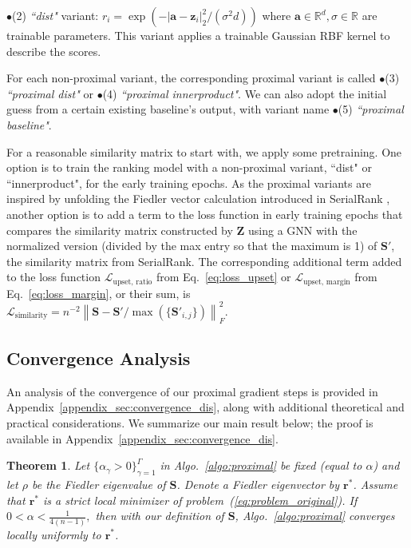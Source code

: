 \documentclass[nohyperref]{article}
\theoremstyle{plain}
\newtheorem{theorem}{Theorem}[section]
\theoremstyle{definition}
\theoremstyle{remark}
\newcommand{\bb}{\hspace{-1mm} $\bullet$}
\begin{document}
\bb (2) \emph{``dist"} variant: $r_i = \exp(-|\mathbf{a}-\mathbf{z}_i|_2^2/(\sigma^2d))$ where $\mathbf{a}\in\mathbb{R}^{d}, \sigma\in\mathbb{R}$ are trainable parameters. This variant applies a trainable Gaussian RBF kernel to describe the scores.

For each non-proximal variant, the corresponding proximal variant
is called \bb (3) \emph{``proximal dist"} or \bb (4) \emph{``proximal innerproduct"}. We can also adopt the initial guess from a certain existing baseline's output, with variant name \bb (5) \emph{``proximal baseline"}.

For a reasonable similarity matrix to start with, we apply some pretraining. One option is to train the ranking model with a non-proximal variant, ``dist" or ``innerproduct", for the early training epochs. 
As the proximal variants are inspired by unfolding the Fiedler vector calculation introduced in SerialRank \cite{fogel2014SerialRank}, another option is to add a term to the loss function in early training epochs that compares the similarity matrix constructed by $\mathbf{Z}$ using a GNN with the normalized version (divided by the max entry so that the maximum is 1) of $\mathbf{S'}$, the similarity matrix from SerialRank. 
The corresponding additional term added to the loss function $\mathcal{L}_\text{upset, ratio}$ from Eq.~\eqref{eq:loss_upset} or $\mathcal{L}_\text{upset, margin}$ from Eq.~\eqref{eq:loss_margin}, or their sum,
is $\mathcal{L}_\text{similarity} = n^{-2}  {\left\lVert \mathbf{S}-\mathbf{S'}/\max(\{\mathbf{S'}_{i,j}\})\right\rVert^2_F}.$
\subsection{Convergence Analysis}
An analysis of the convergence of our proximal gradient steps is provided in Appendix~\ref{appendix_sec:convergence_dis}, along with additional theoretical and practical considerations. We summarize our main result below; the proof is available in  Appendix~\ref{appendix_sec:convergence_dis}.
\begin{theorem}
\label{thm:convergence}
Let $\{\alpha_\gamma>0\}_{\gamma=1}^\Gamma$ in Algo.~\ref{algo:proximal} be fixed (equal to $\alpha$) and let $\rho$ be the Fiedler eigenvalue of $\mathbf{S}$.  Denote a Fiedler eigenvector by $\mathbf{r}^*$. Assume that $\mathbf{r}^*$ is a strict local minimizer of problem~(\ref{eq:problem_original}).
If 
$0<\alpha<\frac{1}{4(n-1)},$ 
then with our definition of $\mathbf{S}$,  Algo.~\ref{algo:proximal} converges locally uniformly to $\mathbf{r}^*$.
\end{theorem} 
    
\end{document}
